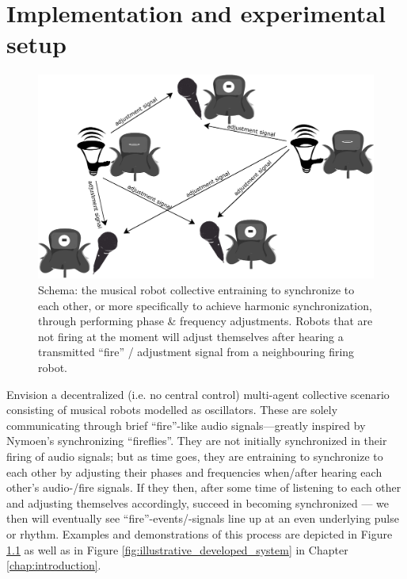 \chapter{Implementation and experimental setup}
\label{chap:implementation}

\begin{figure}[h]
	\centering
	\includegraphics[width=0.9\linewidth]{Assets/DocSegments/Chapters/Implementation/Figures/Illustrations/schematic_initial_idea.pdf}
	\caption[Schema of the developed musical multi robot collective.]{Schema: the musical robot collective entraining to synchronize to each other, or more specifically to achieve harmonic synchronization, through performing phase \& frequency adjustments. Robots that are not firing at the moment will adjust themselves after hearing a transmitted ``fire'' / adjustment signal from a neighbouring firing robot.}
	\label{fig:first_idea:first_fig}
\end{figure}

Envision a decentralized (i.e. no central control) multi-agent collective scenario consisting of musical robots modelled as oscillators. These are solely communicating through brief ``fire''-like audio signals—greatly inspired by Nymoen's synchronizing ``fireflies''. They are not initially synchronized in their firing of audio signals; but as time goes, they are entraining to synchronize to each other by adjusting their phases and frequencies when/after hearing each other's audio-/fire signals. If they then, after some time of listening to each other and adjusting themselves accordingly, succeed in becoming synchronized — we then will eventually see ``fire''-events/-signals line up at an even underlying pulse or rhythm. Examples and demonstrations of this process are depicted in Figure \ref{fig:first_idea:first_fig} as well as in Figure \ref{fig:illustrative_developed_system} in Chapter \ref{chap:introduction}.

